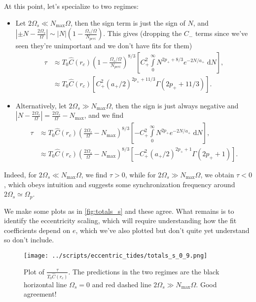 \documentclass[11pt,
        usenames, %
        dvipsnames %
    ]{article}
\newcommand*{\abs}[1]{\left|#1\right|}
\newcommand*{\p}[1]{\left(#1\right)}
\newcommand*{\s}[1]{\left[#1\right]}
\begin{document}
At this point, let's specialize to two regimes:
\begin{itemize}
    \item Let $2\Omega_s \ll N_{\max} \Omega$, then the sign term is just the
        sign of $N$, and $\abs{\pm N - \frac{2\Omega_s}{\Omega}} \sim
        \abs{N}\p{1 - \frac{\Omega_s/\Omega}{N_{peri}}}$. This gives
        (dropping the $C_-$ terms since we've seen they're unimportant and we
        don't have fits for them)
        \begin{align}
            \tau &\approx T_0 \hat{C}(r_c)
                \p{1 - \frac{\Omega_s/\Omega}{N_{peri}}}^{8/3}
            \s{
                C_+^2\int\limits_0^{\infty}
                    N^{2p_+ + 8/3}e^{-2N/a_+}\;\mathrm{d}N},\\
                &\approx T_0\hat{C}(r_c)\s{
                    C_+^2 (a_+/2)^{2p_+ + 11/3} \Gamma\p{2p_+ + 11/3}}.
        \end{align}

    \item Alternatively, let $2\Omega_s \gg N_{\max}\Omega$, then the sign is
        just always negative and $\abs{N - \frac{2\Omega_s}{\Omega}} =
        \frac{2\Omega_s}{\Omega} - N_{\max}$, and we find
        \begin{align}
            \tau &\approx T_0 \hat{C}(r_c) \p{\frac{2\Omega_s}{\Omega} -
                    N_{\max}}^{8/3}
                \s{-C_+^2\int\limits_0^{\infty}
                    N^{2p_+}e^{-2N/a_+}\;\mathrm{d}N},\\
                &\approx T_0\hat{C}(r_c)
                    \p{\frac{2\Omega_s}{\Omega} - N_{\max}}^{8/3}\s{
                        -C_+^2 (a_+/2)^{2p_+ + 1} \Gamma\p{2p_+ + 1}}.
        \end{align}
\end{itemize}
Indeed, for $2\Omega_s \ll N_{\max}\Omega$, we find $\tau > 0$, while for
$2\Omega_s \gg N_{\max} \Omega$, we obtain $\tau < 0$, which obeys intuition and
suggests some synchronization frequency around $2\Omega_s \simeq \Omega_p$.

We make some plots as in \autoref{fig:totals_s} and these agree. What remains is
to identify the eccentricity scaling, which will require understanding how the
fit coefficients depend on $e$, which we've also plotted but don't quite yet
understand so don't include.
\begin{figure}[t]
    \centering
    \texttt{[image: ../scripts/eccentric\_tides/totals\_s\_0\_9.png]}
    \caption{Plot of $\frac{\tau}{T_0 \hat{C}(r_c)}$. The predictions in the two
    regimes are the black horizontal line $\Omega_s = 0$ and red dashed line
    $2\Omega_s \gg N_{\max}\Omega$. Good agreement!}\label{fig:totals_s}
\end{figure}
\end{document}

